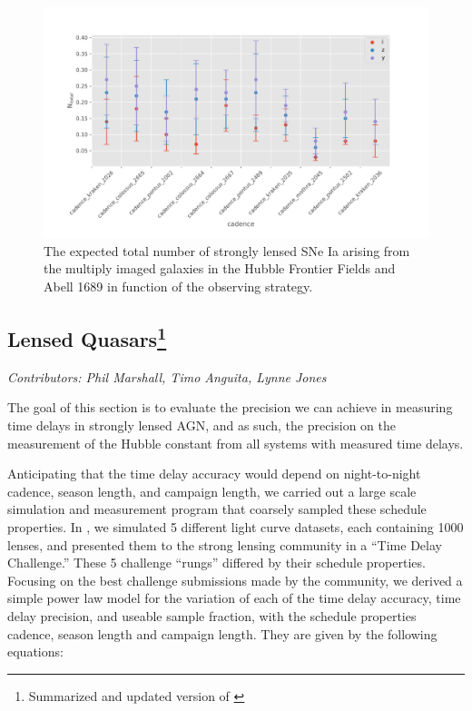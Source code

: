 \begin{figure}
\centering
\includegraphics[scale=0.65]{figures/sl_galaxy_lensing.pdf}\caption{The expected total number of strongly lensed SNe Ia arising from the multiply imaged galaxies in the Hubble Frontier Fields and Abell 1689 in function of the observing strategy. }
\end{figure}


\subsection{Lensed Quasars\footnote{Summarized and updated version of  \citep[Cosmology chapter of][]{LSSTScienceCollaboration2017}}}
\textit{Contributors: Phil Marshall, Timo Anguita, Lynne Jones}


The goal of this section is to evaluate the precision we can achieve in measuring time delays in strongly lensed AGN, and as such, the precision on the measurement of the Hubble constant from all systems with measured time delays.

Anticipating that the time delay accuracy would depend on night-to-night
cadence, season length, and campaign length, we carried out a large
scale simulation and measurement program that coarsely sampled these
schedule properties. In \cite{Liao2015}, we simulated 5 different
light curve datasets, each containing 1000 lenses, and presented them to
the strong lensing community in a ``Time Delay Challenge.'' These 5
challenge ``rungs'' differed by their schedule properties. Focusing on the best challenge
submissions made by the community, we derived a simple power law model
for the variation of each of the time delay accuracy, time delay
precision, and useable sample fraction, with the schedule properties
cadence, season length and campaign length. They are
given by the following equations:

